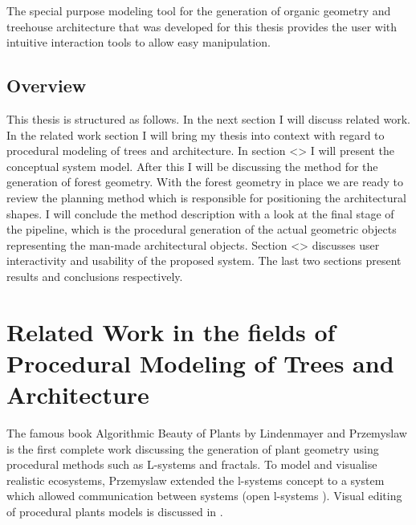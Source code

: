 \documentclass{article}
\newcommand{\old}[1]{\textcolor{myGrey}{\small{\textbf{\newline Old: }\it{#1}}}}
\begin{document}
The special purpose modeling tool for the generation of organic geometry and treehouse architecture that was developed for this thesis provides the user with intuitive interaction tools to allow easy manipulation.        




\subsection{Overview}

This thesis is structured as follows. In the next section I will discuss related work. In the related work section I will bring my thesis into context with regard to procedural modeling 
of trees and architecture. In section <> I will present the conceptual system model. After this I will be discussing the method for the generation of forest geometry. With the forest geometry in place we are ready to review the planning method which is responsible for positioning the architectural shapes. I will conclude the method description with a look at the  final stage of the pipeline, which is the procedural generation of the actual geometric objects representing the man-made architectural objects. Section <> discusses user interactivity and usability of the proposed system. The last two sections present results and conclusions respectively.     


\section{Related Work in the fields of Procedural Modeling of Trees and Architecture}

The famous book Algorithmic Beauty of Plants by Lindenmayer and Przemyslaw \cite{PrzemyslawAlgoBeauty} is the first complete work discussing the generation of plant geometry using procedural methods such as L-systems and fractals. To model and visualise realistic ecosystems, Przemyslaw extended the l-systems concept to a system which allowed communication between systems (open l-systems \cite{PrzemyslawPlants} \cite{Deussen98}). Visual editing of procedural plants models is discussed in \cite{interactivebonsai}. 
\end{document}
